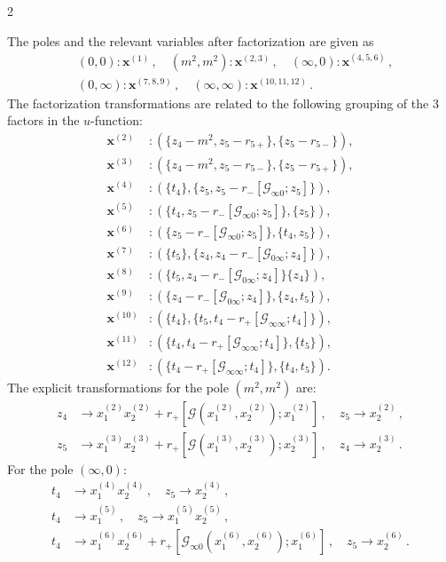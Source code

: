 \documentclass[fleqn]{2023SCGE}
\newcommand{\nn}{\nonumber}
\newcommand{\mG}{\mathcal{G}}
\begin{document}
\begin{multicols}{2}
\begin{appendix}
The poles and the relevant variables after factorization are given as
\begin{align}
 &(0,0): \bm{x}^{(1)} \,, \quad (m^2,m^2): \bm{x}^{(2,3)} \,, \quad (\infty,0): \bm{x}^{(4,5,6)} \,, \nn\\
 &(0,\infty): \bm{x}^{(7,8,9)} \,, \quad (\infty,\infty): \bm{x}^{(10,11,12)} \,.
\end{align}
The factorization transformations are related to the following grouping of the 3 factors in the $u$-function:
\begin{align}
\bm{x}^{(2)} &: (\{z_4-m^2,z_5-r_{5+}\} , \{z_5-r_{5-}\}),\nn\\
\bm{x}^{(3)} &: (\{z_4-m^2,z_5-r_{5-}\} , \{z_5-r_{5+}\}),\nn\\
\bm{x}^{(4)} &: (\{t_4\} , \{z_5,z_5-r_-[\mG_{\infty0};z_5]\}),\nn\\
\bm{x}^{(5)} &: (\{t_4,z_5-r_-[\mG_{\infty0};z_5]\},\{z_5\}),\nn\\
\bm{x}^{(6)} &: (\{z_5-r_-[\mG_{\infty0};z_5] \}, \{t_4,z_5\}),\nn\\
\bm{x}^{(7)} &: (\{t_5\} , \{z_4,z_4-r_-[\mG_{0\infty};z_4]\}),\nn\\
\bm{x}^{(8)} &: (\{t_5,z_4-r_-[\mG_{0\infty};z_4]\}\{z_4\} ),\nn\\
\bm{x}^{(9)} &: (\{z_4-r_-[\mG_{0\infty};z_4]\} , \{z_4,t_5\}),\nn\\
\bm{x}^{(10)} &: (\{t_4\} , \{t_5,t_4-r_+[\mG_{\infty\infty};t_4]\}),\nn\\
\bm{x}^{(11)} &: ( \{t_4,t_4-r_+[\mG_{\infty\infty};t_4]\},\{t_5\} ),\nn\\
\bm{x}^{(12)} &: (\{t_4-r_+[\mG_{\infty\infty};t_4]\} , \{t_4,t_5\}).
\end{align}
The explicit transformations for the pole $(m^2,m^2)$ are:
\begin{align}
	z_4 &\to x_1^{(2)} x_2^{(2)} +r_{+}[\mG(x_1^{(2)},x_2^{(2)});x_1^{(2)}] \,, \quad z_5 \to x_2^{(2)} \,,\nn\\
	z_5 &\to x_1^{(3)} x_2^{(3)} +r_{+}[\mG(x_1^{(3)},x_2^{(3)});x_2^{(3)}] \,, \quad z_4 \to x_2^{(3)} \,.
\end{align}
For the pole $(\infty,0)$:
\begin{align}
t_4 &\to x_1^{(4)} x_2^{(4)} \,, \quad z_5 \to x_2^{(4)} \,, \nn
\\
t_4 &\to x_1^{(5)} \,, \quad z_5 \to x_1^{(5)} x_2^{(5)} \,, \nn
\\
t_4 &\to x_1^{(6)} x_2^{(6)} + r_{+}[\mG_{\infty0}(x_1^{(6)},x_2^{(6)});x_1^{(6)}] \,, \quad z_5\to  x_2^{(6)} \,.

\end{align}
\end{appendix}
\end{multicols}
\end{document}

